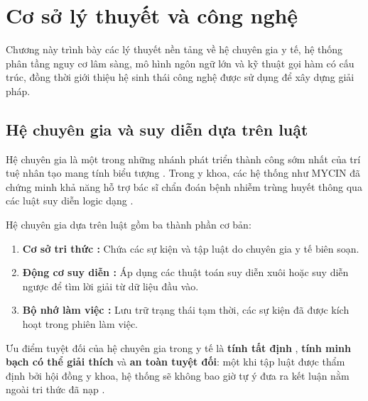 \chapter{Cơ sở lý thuyết và công nghệ}
\label{ch:coso}

\begin{muctieu}
Chương này trình bày các lý thuyết nền tảng về hệ chuyên gia y tế, hệ thống
phân tầng nguy cơ lâm sàng, mô hình ngôn ngữ lớn và kỹ thuật gọi hàm có cấu
trúc, đồng thời giới thiệu hệ sinh thái công nghệ được sử dụng để xây dựng giải pháp.
\end{muctieu}

\section{Hệ chuyên gia và suy diễn dựa trên luật}

Hệ chuyên gia  là một trong những nhánh phát triển thành
công sớm nhất của trí tuệ nhân tạo mang tính biểu tượng 
\cite{RussellNorvig2021, HoangKiem}. Trong y khoa, các hệ thống như MYCIN \cite{Buchanan1984}
đã chứng minh khả năng hỗ trợ bác sĩ chẩn đoán bệnh nhiễm trùng huyết thông qua
các luật suy diễn logic dạng .

\begin{dinhnghia}
Hệ chuyên gia dựa trên luật  gồm ba thành phần cơ bản:
\begin{enumerate}[leftmargin=1.5em, itemsep=2pt]
  \item \textbf{Cơ sở tri thức :} Chứa các sự kiện 
        và tập luật  do chuyên gia y tế biên soạn.
  \item \textbf{Động cơ suy diễn :} Áp dụng các thuật toán
        suy diễn xuôi  hoặc suy diễn ngược
         để tìm lời giải từ dữ liệu đầu vào.
  \item \textbf{Bộ nhớ làm việc :} Lưu trữ trạng thái tạm thời,
        các sự kiện đã được kích hoạt trong phiên làm việc.
\end{enumerate}
\end{dinhnghia}

Ưu điểm tuyệt đối của hệ chuyên gia trong y tế là \textbf{tính tất định
}, \textbf{tính minh bạch có thể giải thích }
và \textbf{an toàn tuyệt đối}: một khi tập luật được thẩm định bởi hội đồng y khoa,
hệ thống sẽ không bao giờ tự ý đưa ra kết luận nằm ngoài tri thức đã nạp \cite{Musen2014}.

